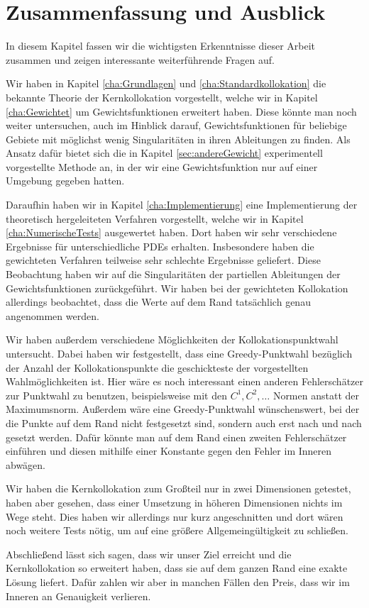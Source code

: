 \chapter{Zusammenfassung und Ausblick}
\label{cha:schluss}

In diesem Kapitel fassen wir die wichtigsten Erkenntnisse dieser Arbeit zusammen und zeigen interessante weiterführende Fragen auf.

Wir haben in Kapitel \ref{cha:Grundlagen} und \ref{cha:Standardkollokation} die bekannte Theorie der Kernkollokation vorgestellt, welche wir in Kapitel \ref{cha:Gewichtet} um Gewichtsfunktionen erweitert haben. Diese könnte man noch weiter untersuchen, auch im Hinblick darauf, Gewichtsfunktionen für beliebige Gebiete mit möglichst wenig Singularitäten in ihren Ableitungen zu finden. Als Ansatz dafür bietet sich die in Kapitel \ref{sec:andereGewicht} experimentell vorgestellte Methode an, in der wir eine Gewichtsfunktion nur auf einer Umgebung gegeben hatten.

Daraufhin haben wir in Kapitel \ref{cha:Implementierung} eine Implementierung der theoretisch hergeleiteten Verfahren vorgestellt, welche wir in Kapitel \ref{cha:NumerischeTests} ausgewertet haben. Dort haben wir sehr verschiedene Ergebnisse für unterschiedliche \acp{PDE} erhalten. Insbesondere haben die gewichteten Verfahren teilweise sehr schlechte Ergebnisse geliefert. Diese Beobachtung haben wir auf die Singularitäten der partiellen Ableitungen der Gewichtsfunktionen zurückgeführt. Wir haben bei der gewichteten Kollokation allerdings beobachtet, dass die Werte auf dem Rand tatsächlich genau angenommen werden.

Wir haben außerdem verschiedene Möglichkeiten der Kollokationspunktwahl untersucht. Dabei haben wir festgestellt, dass eine Greedy-Punktwahl bezüglich der Anzahl der Kollokationspunkte die geschickteste der vorgestellten Wahlmöglichkeiten ist. Hier wäre es noch interessant einen anderen Fehlerschätzer zur Punktwahl zu benutzen, beispielsweise mit den $C^1, C^2, \dots$ Normen anstatt der Maximumsnorm. Außerdem wäre eine Greedy-Punktwahl wünschenswert, bei der die Punkte auf dem Rand nicht festgesetzt sind, sondern auch erst nach und nach gesetzt werden. Dafür könnte man auf dem Rand einen zweiten Fehlerschätzer einführen und diesen mithilfe einer Konstante gegen den Fehler im Inneren abwägen.

Wir haben die Kernkollokation zum Großteil nur in zwei Dimensionen getestet, haben aber gesehen, dass einer Umsetzung in höheren Dimensionen nichts im Wege steht. Dies haben wir allerdings nur kurz angeschnitten und dort wären noch weitere Tests nötig, um auf eine größere Allgemeingültigkeit zu schließen.

Abschließend lässt sich sagen, dass wir unser Ziel erreicht und die Kernkollokation so erweitert haben, dass sie auf dem ganzen Rand eine exakte Lösung liefert. Dafür zahlen wir aber in manchen Fällen den Preis, dass wir im Inneren an Genauigkeit verlieren.